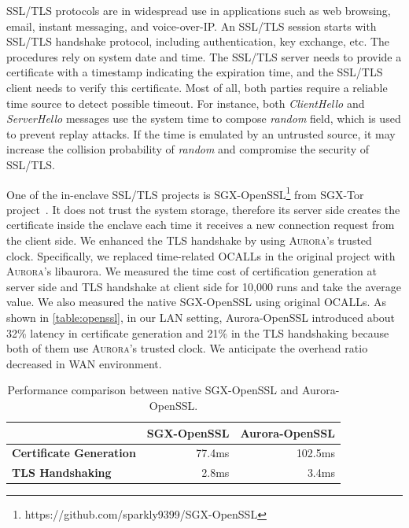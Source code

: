 SSL/TLS protocols are in widespread use in applications such as web browsing, email, instant messaging, and voice-over-IP. 
An SSL/TLS session starts with SSL/TLS handshake protocol, including authentication, key exchange, etc. The procedures rely on system date and time. The SSL/TLS server needs to provide a certificate with a timestamp indicating the expiration time, and the SSL/TLS client needs to verify this certificate. Most of all, both parties require a reliable time source to detect possible timeout. For instance, both \emph{ClientHello} and \emph{ServerHello} messages use the system time to compose \textit{random} field, which is used to prevent replay attacks. If the time is emulated by an untrusted source, it may increase the collision probability of \emph{random} and compromise the security of SSL/TLS.

One of the in-enclave SSL/TLS projects is SGX-OpenSSL\footnote{https://github.com/sparkly9399/SGX-OpenSSL} from SGX-Tor project~\cite{DBLP:conf/nsdi/KimHHKH17}. It does not trust the system storage, therefore its server side creates the certificate inside the enclave each time it receives a new connection request from the client side. We enhanced the TLS handshake by using \textsc{Aurora}'s trusted clock. Specifically, we replaced time-related OCALLs in the original project with \textsc{Aurora}'s libaurora. %
We measured the time cost of certification generation at server side and TLS handshake at client side for 10,000 runs and take the average value. We also measured the native SGX-OpenSSL using original OCALLs. As shown in \autoref{table:openssl}, in our LAN setting, Aurora-OpenSSL introduced about 32\% latency in certificate generation and 21\% in the TLS handshaking because both of them use \textsc{Aurora}'s trusted clock. We anticipate the overhead ratio decreased in WAN environment.

\begin{table}[t]
	\centering
	\caption{Performance comparison between native SGX-OpenSSL and Aurora-OpenSSL.}
	\label{table:openssl}
	\small
	\begin{tabular}{lrr}
		\toprule
		& \textbf{SGX-OpenSSL} & \textbf{Aurora-OpenSSL} \\
		\midrule
		\textbf{Certificate Generation} & 77.4ms & 102.5ms \\
		\textbf{TLS Handshaking} & 2.8ms & 3.4ms \\
		\bottomrule
	\end{tabular}
\end{table}

